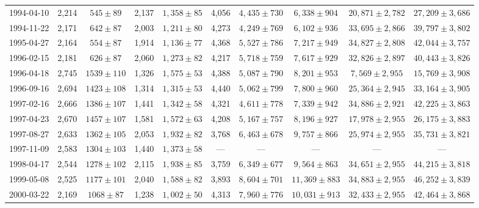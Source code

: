 \begin{landscape}
\begin{longtable}{cccccccccc}
{1994-04-10} & 2,214 & {$545  \pm  89$} & 2,137 & {$1,358 \pm 85$} & 4,056 & {$4,435 \pm 730$} & {$6,338 \pm 904$} & {$20,871 \pm 2,782$} & {$27,209 \pm 3,686$} \\
{1994-11-22} & 2,171 & {$642  \pm  87$} & 2,003 & {$1,211 \pm 80$} & 4,273 & {$4,249 \pm 769$} & {$6,102 \pm 936$} & {$33,695 \pm 2,866$} & {$39,797 \pm 3,802$} \\
{1995-04-27} & 2,164 & {$554  \pm  87$} & 1,914 & {$1,136 \pm 77$} & 4,368 & {$5,527 \pm 786$} & {$7,217 \pm 949$} & {$34,827 \pm 2,808$} & {$42,044 \pm 3,757$} \\
{1996-02-15} & 2,181 & {$626  \pm  87$} & 2,060 & {$1,273 \pm 82$} & 4,217 & {$5,718 \pm 759$} & {$7,617 \pm 929$} & {$32,826 \pm 2,897$} & {$40,443 \pm 3,826$} \\
{1996-04-18} & 2,745 & {$1539  \pm  110$} & 1,326 & {$1,575 \pm 53$} & 4,388 & {$5,087 \pm 790$} & {$8,201 \pm 953$} & {$7,569 \pm 2,955$} & {$15,769 \pm 3,908$} \\
{1996-09-16} & 2,694 & {$1423  \pm  108$} & 1,314 & {$1,315 \pm 53$} & 4,440 & {$5,062 \pm 799$} & {$7,800 \pm 960$} & {$25,364 \pm 2,945$} & {$33,164 \pm 3,905$} \\
{1997-02-16} & 2,666 & {$1386  \pm  107$} & 1,441 & {$1,342 \pm 58$} & 4,321 & {$4,611 \pm 778$} & {$7,339 \pm 942$} & {$34,886 \pm 2,921$} & {$42,225 \pm 3,863$} \\
{1997-04-23} & 2,670 & {$1457  \pm  107$} & 1,581 & {$1,572 \pm 63$} & 4,208 & {$5,167 \pm 757$} & {$8,196 \pm 927$} & {$17,978 \pm 2,955$} & {$26,175 \pm 3,883$} \\
{1997-08-27} & 2,633 & {$1362  \pm  105$} & 2,053 & {$1,932 \pm 82$} & 3,768 & {$6,463 \pm 678$} & {$9,757 \pm 866$} & {$25,974 \pm 2,955$} & {$35,731 \pm 3,821$} \\
{1997-11-09} & 2,583 & {$1304  \pm  103$} & 1,440 & {$1,373 \pm 58$} & --- & --- & --- & --- & --- \\
{1998-04-17} & 2,544 & {$1278  \pm  102$} & 2,115 & {$1,938 \pm 85$} & 3,759 & {$6,349 \pm 677$} & {$9,564 \pm 863$} & {$34,651 \pm 2,955$} & {$44,215 \pm 3,818$} \\
{1999-05-08} & 2,525 & {$1177  \pm  101$} & 2,040 & {$1,588 \pm 82$} & 3,893 & {$8,604 \pm 701$} & {$11,369 \pm 883$} & {$34,883 \pm 2,955$} & {$46,252 \pm 3,839$} \\
{2000-03-22} & 2,169 & {$1068  \pm  87$} & 1,238 & {$1,002 \pm 50$} & 4,313 & {$7,960 \pm 776$} & {$10,031 \pm 913$} & {$32,433 \pm 2,955$} & {$42,464 \pm 3,868$} \\

\end{longtable}
\end{landscape}
